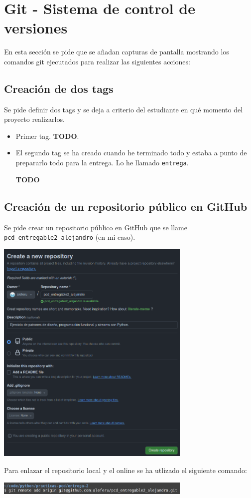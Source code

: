 \section{Git - Sistema de control de versiones}

En esta sección se pide que se añadan capturas de pantalla mostrando los comandos git ejecutados para realizar las siguientes acciones:

\subsection{Creación de dos tags}

Se pide definir dos tags y se deja a criterio del estudiante en qué momento del proyecto realizarlos.

\begin{itemize}
    \item Primer tag. \textbf{TODO}.

    \item El segundo tag se ha creado cuando he terminado todo y estaba a punto de prepararlo todo para la entrega. Lo he llamado \texttt{entrega}.

    \begin{center}
        \textbf{TODO}
    \end{center}
\end{itemize}


\subsection{Creación de un repositorio público en GitHub}

Se pide crear un repositorio público en GitHub que se llame \texttt{pcd\_entregable2\_alejandro} (en mi caso).

\begin{center}
    \includegraphics[width=0.7\textwidth]{img/creacion-repositorio-online.png}
\end{center}

Para enlazar el repositorio local y el online se ha utlizado el siguiente comando:

\begin{center}
    \includegraphics[width=0.7\textwidth]{img/repositorio-local-origin.png}
\end{center}

